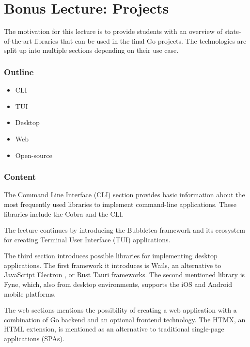 \documentclass[
  digital,
  color,
  oneside,
  nosansbold,
  nocolorbold,
  lof,
  nolot,
]{fithesis4}
\begin{document}
\section{Bonus Lecture: Projects} \label{lecture-projects}

The motivation for this lecture is to provide students with an overview of state-of-the-art libraries that can be used in the final Go projects. The technologies are split up into multiple sections depending on their use case.

\subsubsection{Outline}

\begin{itemize}
    \item CLI
    \item TUI
    \item Desktop
    \item Web
    \item Open-source
\end{itemize}

\subsubsection{Content}

The Command Line Interface (CLI) section provides basic information about the most frequently used libraries to implement command-line applications. These libraries include the Cobra\cite{spf13-cobra} and the CLI\cite{urfave-cli}.

The lecture continues by introducing the Bubbletea\cite{charmbracelet-bubbletea} framework and its ecosystem for creating Terminal User Interface (TUI) applications.

The third section introduces possible libraries for implementing desktop applications. The first framework it introduces is Wails\cite{wailsapp-wails}, an alternative to JavaScript Electron \cite{electron-electron}, or Rust Tauri\cite{tauri-apps-tauri} frameworks. The second mentioned library is Fyne\cite{fyne-io-fyne}, which, also from desktop environments, supports the iOS and Android mobile platforms.

The web sections mentions the possibility of creating a web application with a combination of Go backend and an optional frontend technology. The HTMX\cite{bigskysoftware-htmx}, an HTML extension, is mentioned as an alternative to traditional single-page applications (SPAs).
\end{document}
